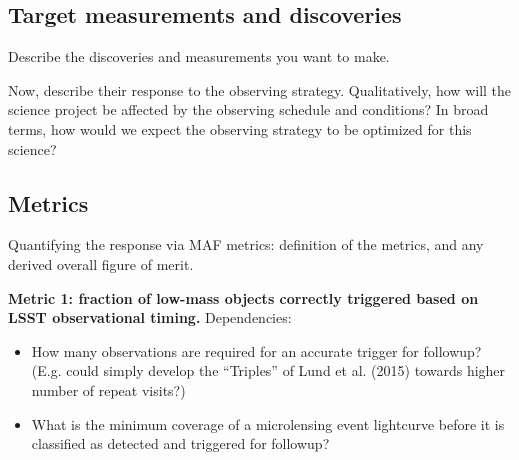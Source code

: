 
\subsection{Target measurements and discoveries}
\label{sec:keyword:targets}

Describe the discoveries and measurements you want to make.

Now, describe their response to the observing strategy. Qualitatively,
how will the science project be affected by the observing schedule and
conditions? In broad terms, how would we expect the observing strategy
to be optimized for this science?



\subsection{Metrics}
\label{sec:keyword:metrics}

Quantifying the response via MAF metrics: definition of the metrics,
and any derived overall figure of merit.

{\bf Metric 1: fraction of low-mass objects correctly triggered based
  on LSST observational timing.} Dependencies:
\begin{itemize}
  \item How many observations are required for an accurate trigger for followup? (E.g. could simply develop the ``Triples'' of Lund et al. (2015) towards higher number of repeat visits?) 
\item What is the minimum coverage of a microlensing event lightcurve before it is classified as detected and triggered for followup? 
\end{itemize}

